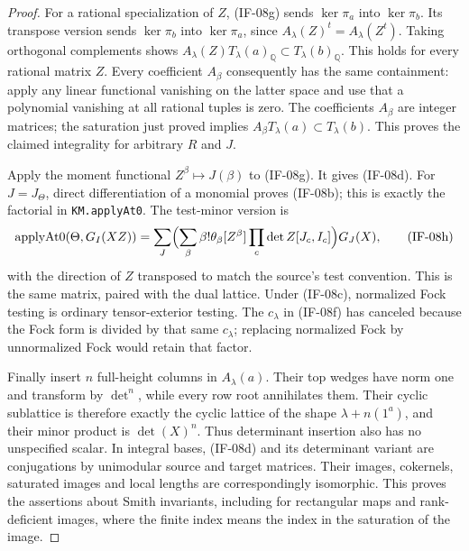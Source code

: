 \begin{proof}
For a rational specialization of $Z$, (IF-08g) sends $\ker\pi_a$
into $\ker\pi_b$. Its transpose version sends $\ker\pi_b$ into
$\ker\pi_a$, since $A_\lambda(Z)^t=A_\lambda(Z^t)$.
Taking orthogonal complements shows
$A_\lambda(Z)T_\lambda(a)_\mathbb Q\subset
T_\lambda(b)_\mathbb Q$. This holds for every rational matrix $Z$.
Every coefficient $A_\beta$ consequently has the same containment:
apply any linear functional vanishing on the latter space and use
that a polynomial vanishing at all rational tuples is zero.
The coefficients $A_\beta$ are integer matrices; the saturation just
proved implies $A_\beta T_\lambda(a)\subset T_\lambda(b)$.
This proves the claimed integrality for arbitrary $R$ and $J$.

Apply the moment functional $Z^\beta\mapsto J(\beta)$ to (IF-08g).
It gives (IF-08d). For $J=J_\Theta$, direct differentiation of a
monomial proves (IF-08b); this is exactly the factorial in
\texttt{KM.applyAt0}. The test-minor version is
\[
 \operatorname{applyAt0}(\Theta,G_I(XZ))
   =\sum_J \Bigl(\sum_\beta\beta!\theta_\beta
                [Z^\beta]\prod_c\det Z[J_c,I_c]\Bigr)G_J(X),
                                                               \tag{IF-08h}
\]
with the direction of $Z$ transposed to match the source's test
convention. This is the same matrix, paired with the dual lattice.
Under (IF-08c), normalized Fock testing is ordinary tensor-exterior
testing. The $c_\lambda$ in (IF-08f) has canceled because the Fock
form is divided by that same $c_\lambda$; replacing normalized Fock
by unnormalized Fock would retain that factor.

Finally insert $n$ full-height columns in $A_\lambda(a)$. Their top
wedges have norm one and transform by $\det^n$, while every row root
annihilates them. Their cyclic sublattice is therefore exactly the
cyclic lattice of the shape $\lambda+n(1^a)$, and their minor product
is $\det(X)^n$. Thus determinant insertion also has no unspecified
scalar. In integral bases, (IF-08d) and its determinant variant are
conjugations by unimodular source and target matrices. Their images,
cokernels, saturated images and local lengths are correspondingly
isomorphic. This proves the assertions about Smith invariants,
including for rectangular maps and rank-deficient images, where the
finite index means the index in the saturation of the image.
\end{proof}

